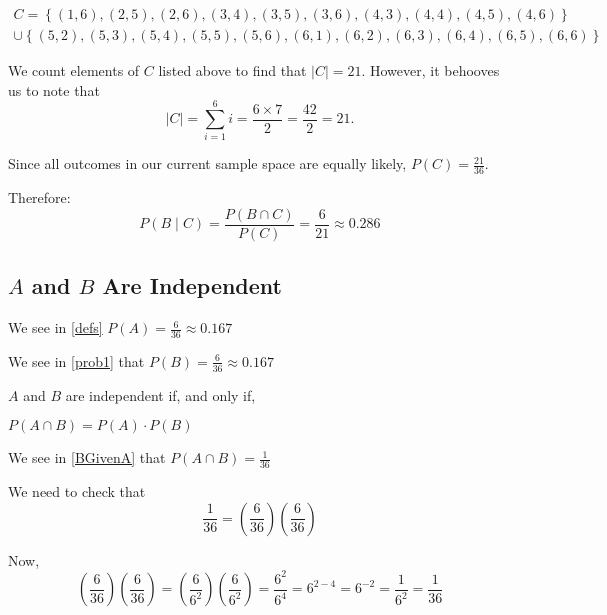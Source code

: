 \documentclass[a4paper,11pt]{article}
\begin{document}
\begin{multline}
  C = \left\{ \left( 1, 6 \right),
    \left( 2, 5 \right),
    \left( 2, 6 \right),
    \left( 3, 4 \right),
    \left( 3, 5 \right),
    \left( 3, 6 \right),
    \left( 4, 3 \right),
    \left( 4, 4 \right),
    \left( 4, 5 \right),
    \left( 4, 6 \right)\right\} \\ \cup \left\{ \left( 5, 2 \right),
    \left( 5, 3 \right),
    \left( 5, 4 \right),
    \left( 5, 5 \right),
    \left( 5, 6 \right),
    \left( 6, 1 \right),
    \left( 6, 2 \right),
    \left( 6, 3 \right),
    \left( 6, 4 \right),
    \left( 6, 5 \right),
    \left( 6, 6 \right) \right\}
\end{multline}


We count elements of $C$ listed above to find that $\left| C \right|
= 21$.  However, it behooves us to note that 
\begin{equation}
  \left| C \right| = \sum_{i=1}^{6} i = \frac{6 \times 7} {2} = 
    \frac{42}{2} = 21.
\end{equation}

Since all outcomes in our current sample space are equally
likely, $P \left( C \right) = \frac{21}{36}$.

Therefore:
\begin{equation}
  P\left( B \mid C \right) = 
  \frac{P\left( B \cap C \right)} {P\left( C \right)}
  = \frac{6}{21} \approx 0.286
\end{equation}

\subsection{$A$ and $B$ Are Independent} \label{bcindependent}
We see in  \ref{defs} $P \left( A \right) = \frac{6}{36} \approx 0.167$

We see in \ref{prob1} that $P \left(B \right) = \frac{6}{36} \approx 0.167$

$A$ and $B$ are independent if, and only if, 

$P\left( A \cap B \right) = P\left( A \right) \cdot P\left(B \right)$

We see in \ref{BGivenA} that $P\left(A \cap B \right)=\frac{1}{36}$

We need to check that 
\begin{equation}
  \frac{1}{36}
  = \left( \frac{6}{36} \right) \left( \frac{6}{36} \right)
\end{equation}

Now, 
\begin{equation}
  \left( \frac{6}{36} \right) \left( \frac{6}{36} \right)
  = \left( \frac{6}{6^{2}} \right) \left( \frac{6}{6^{2}} \right)
  =  \frac{6^{2}}{6^{4}}
  = 6^{2-4} = 6^{-2} = \frac{1}{6^{2}} = \frac{1}{36}
\end{equation}
\end{document}
